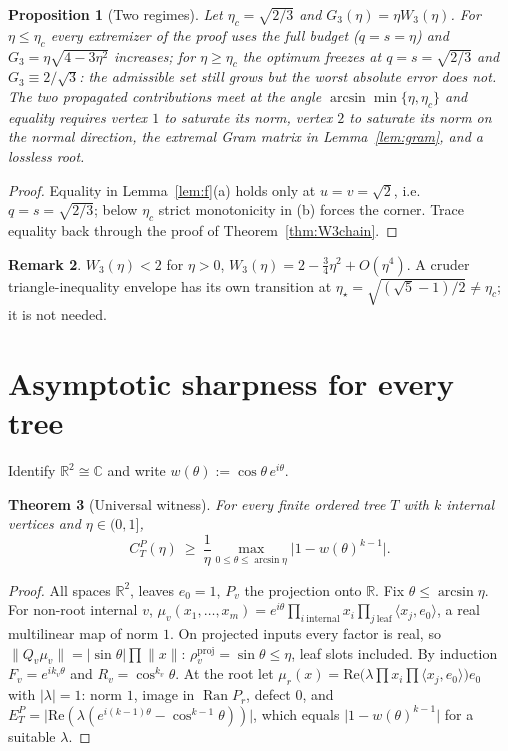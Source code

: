 \documentclass[11pt]{amsart}
\newtheorem{theorem}{Theorem}[section]
\newtheorem{proposition}[theorem]{Proposition}
\theoremstyle{definition}
\newtheorem{remark}[theorem]{Remark}
\newcommand{\R}{\mathbb{R}}
\newcommand{\C}{\mathbb{C}}
\newcommand{\Ran}{\operatorname{Ran}}
\newcommand{\proj}{\mathrm{proj}}
\newcommand{\norm}[1]{\lVert #1\rVert}
\newcommand{\ip}[2]{\langle #1,#2\rangle}
\begin{document}
\begin{proposition}[Two regimes]
Let $\eta_c=\sqrt{2/3}$ and $G_3(\eta)=\eta W_3(\eta)$. For $\eta\le\eta_c$ every
extremizer of the proof uses the full budget ($q=s=\eta$) and $G_3=\eta\sqrt{4-3\eta^2}$ increases;
for $\eta\ge\eta_c$ the optimum freezes at $q=s=\sqrt{2/3}$ and $G_3\equiv2/\sqrt3$: the admissible
set still grows but the worst absolute error does not.
The two propagated contributions meet at the angle $\arcsin\min\{\eta,\eta_c\}$ and equality
requires vertex $1$ to saturate its norm, vertex $2$ to saturate its norm on the normal direction,
the extremal Gram matrix in Lemma~\ref{lem:gram}, and a lossless root.
\end{proposition}
\begin{proof}
Equality in Lemma~\ref{lem:f}(a) holds only at $u=v=\sqrt2$, i.e.\ $q=s=\sqrt{2/3}$; below
$\eta_c$ strict monotonicity in (b) forces the corner. Trace equality back through the proof of
Theorem~\ref{thm:W3chain}.
\end{proof}

\begin{remark}
$W_3(\eta)<2$ for $\eta>0$, $W_3(\eta)=2-\tfrac34\eta^2+O(\eta^4)$. A cruder
triangle-inequality envelope has its own transition at $\eta_\star=\sqrt{(\sqrt5-1)/2}\ne\eta_c$;
it is not needed.
\end{remark}

\section{Asymptotic sharpness for every tree}

Identify $\R^2\cong\C$ and write $w(\theta):=\cos\theta\,e^{i\theta}$.

\begin{theorem}[Universal witness]\label{thm:universalwitness}
For every finite ordered tree $T$ with $k$ internal vertices and $\eta\in(0,1]$,
\[
C^P_T(\eta)\ \ge\ \frac1\eta\max_{0\le\theta\le\arcsin\eta}\bigl\lvert1-w(\theta)^{k-1}\bigr\rvert .
\]
\end{theorem}
\begin{proof}
All spaces $\R^2$, leaves $e_0=1$, $P_v$ the projection onto $\R$. Fix
$\theta\le\arcsin\eta$. For non-root internal $v$,
$\mu_v(x_1,\dots,x_m)=e^{i\theta}\prod_{i\ \mathrm{internal}}x_i\prod_{j\ \mathrm{leaf}}\ip{x_j}{e_0}$,
a real multilinear map of norm $1$. On projected inputs every factor is real, so
$\norm{Q_v\mu_v}=\lvert\sin\theta\rvert\prod\norm{x}$: $\rho^\proj_v=\sin\theta\le\eta$, leaf slots
included. By induction $F_v=e^{ik_v\theta}$ and $R_v=\cos^{k_v}\theta$. At the root let
$\mu_r(x)=\mathrm{Re}\bigl(\lambda\prod x_i\prod\ip{x_j}{e_0}\bigr)e_0$ with $\lvert\lambda\rvert=1$:
norm $1$, image in $\Ran P_r$, defect $0$, and
$E^P_T=\lvert\mathrm{Re}(\lambda(e^{i(k-1)\theta}-\cos^{k-1}\theta))\rvert$, which equals
$\lvert1-w(\theta)^{k-1}\rvert$ for a suitable $\lambda$.
\end{proof}
\end{document}
